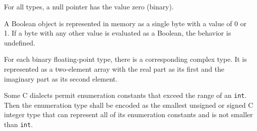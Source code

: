 \documentclass[english,11pt,twoside,toc=bib,toc=idx]{scrreprt}
\begin{document}
For all types, a null pointer has the value zero (binary).

A Boolean object is represented in memory as a single byte
with a value of 0 or 1.  If a byte with any other value is evaluated as a
Boolean, the behavior is undefined.

For each binary floating-point type, there is a corresponding complex
type.  It is represented as a two-element array with
the real part as its first and the imaginary part as its second element.

Some C dialects permit enumeration constants that exceed the range of an
\texttt{int}.  Then the enumeration type shall be
encoded as the smallest unsigned or signed C integer type that can
represent all of its enumeration constants and is not smaller than
\texttt{int}.
\end{document}
